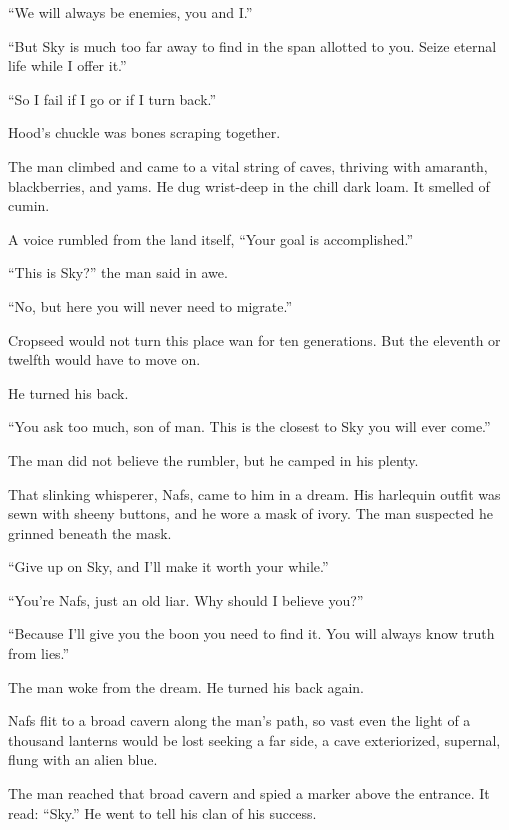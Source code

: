 ``We will always be enemies, you and I.''

``But Sky is much too far away to find in the span allotted to you.
Seize eternal life while I offer it.''

``So I fail if I go or if I turn back.''

Hood's chuckle was bones scraping together.

The man climbed and came to a vital string of caves, thriving with
amaranth, blackberries, and yams. He dug wrist-deep in the chill dark
loam. It smelled of cumin.

A voice rumbled from the land itself, ``Your goal is accomplished.''

``This is Sky?'' the man said in awe.

``No, but here you will never need to migrate.''

Cropseed would not turn this place wan for ten generations. But the
eleventh or twelfth would have to move on.

He turned his back.

``You ask too much, son of man. This is the closest to Sky you will ever
come.''

The man did not believe the rumbler, but he camped in his plenty.

That slinking whisperer, Nafs, came to him in a dream. His harlequin
outfit was sewn with sheeny buttons, and he wore a mask of ivory. The
man suspected he grinned beneath the mask.

``Give up on Sky, and I'll make it worth your while.''

``You're Nafs, just an old liar. Why should I believe you?''

``Because I'll give you the boon you need to find it. You will always
know truth from lies.''

The man woke from the dream. He turned his back again.

Nafs flit to a broad cavern along the man's path, so vast even the light
of a thousand lanterns would be lost seeking a far side, a cave
exteriorized, supernal, flung with an alien blue.

The man reached that broad cavern and spied a marker above the entrance.
It read: ``Sky.'' He went to tell his clan of his success.
